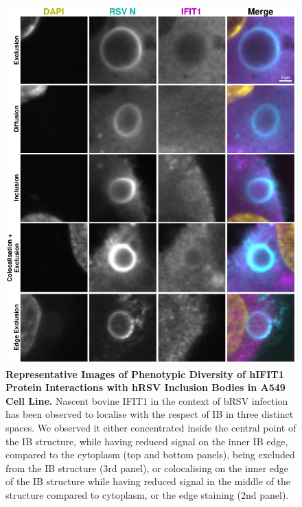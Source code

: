 \begin{figure}
    \centering
    \includegraphics[width=1\linewidth]{09. Chapter 4/Figs/02. Infection/01. IFIT1/03. a549 i1.pdf}
    \caption[Representative Images of Phenotypic Diversity of hIFIT1 Protein Interactions with hRSV Inclusion Bodies in A549 Cell Line.]{\textbf{Representative Images of Phenotypic Diversity of hIFIT1 Protein Interactions with hRSV Inclusion Bodies in A549 Cell Line.} Nascent bovine IFIT1 in the context of bRSV infection has been observed to localise with the respect of IB in three distinct spaces. We observed it either concentrated inside the central point of the IB structure, while having reduced signal on the inner IB edge, compared to the cytoplasm (top and bottom panels), being excluded from the IB structure (3rd panel), or colocalising on the inner edge of the IB structure while having reduced signal in the middle of the structure compared to cytoplasm, or the edge staining (2nd panel).}
    \label{fig:Representative Images of Phenotypic Diversity of hIFIT1 Protein Interactions with hRSV Inclusion Bodies in A549 Cell Line}
\end{figure}



